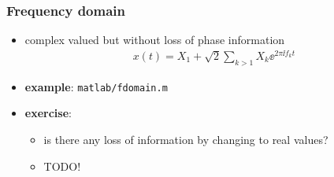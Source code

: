 \begin{frame} %
	\frametitle{Frequency domain}
	\begin{itemize}
		\item complex valued but without loss of phase information
			\begin{align*}
				x(t)=X_1+\sqrt2\sum_{k>1}X_k\ee^{2\pi\ii f_kt}
			\end{align*}
		\item \textbf{example}: \texttt{matlab/fdomain.m}
			\begin{figure}
				\centering
				\begin{subfigure}[c]{0.48\linewidth}
				\end{subfigure}
				\hspace{0.01\linewidth}
				\begin{subfigure}[c]{0.48\linewidth}
				\end{subfigure}
			\end{figure}
		\item \textbf{exercise}:
			\begin{itemize}
				\item is there any loss of information by changing to real values?
				\item TODO!
			\end{itemize}
	\end{itemize}
\end{frame}

